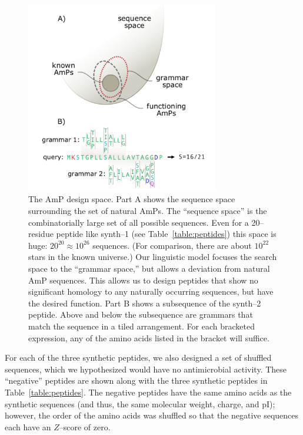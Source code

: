         \begin{figure}
        \centering
        \includegraphics[width=0.75\textwidth]{Body/Images-chap2/space.pdf}
        \caption[Design space]{ The AmP design space.
        Part A shows the sequence space surrounding the set of
        natural AmPs.  The ``sequence space'' is the combinatorially
        large set of all possible sequences.  Even for a 20--residue
        peptide like synth--1 (see Table~\ref{table:peptides})
        this space is huge: $20^{20}\approx 10^{26}$ sequences.
        (For comparison, there are about $10^{22}$ stars in the known
        universe.)  Our linguistic model focuses the search space to
        the ``grammar space,'' but allows a deviation from natural
        AmP sequences.  This allows us to design peptides that show
        no significant homology to any naturally occurring sequences,
        but have the desired function.  Part B shows a subsequence
        of the synth--2 peptide.  Above and below the subsequence
        are grammars that match the sequence in a tiled arrangement.
        For each bracketed expression, any of the amino acids listed
        in the bracket will suffice.}
        \label{fig:space}
    \end{figure}


    For each of the three synthetic peptides, we also designed a
    set of shuffled sequences, which we hypothesized would have no
    antimicrobial activity.  These ``negative'' peptides are shown along
    with the three synthetic peptides in Table~\ref{table:peptides}.
    The negative peptides have the same amino acids as the synthetic
    sequences (and thus, the same molecular weight, charge, and pI);
    however, the order of the amino acids was shuffled so that the
    negative sequences each have an $Z$--score of zero.



